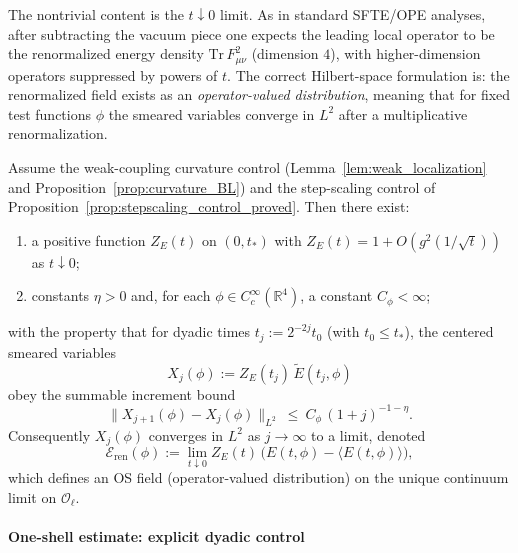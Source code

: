 The nontrivial content is the $t\downarrow 0$ limit.
As in standard SFTE/OPE analyses, after subtracting the vacuum piece one expects the leading local operator to be the renormalized 
energy density $\mathrm{Tr}\,F_{\mu\nu}^2$ (dimension $4$), with higher-dimension operators suppressed by powers of $t$.
The correct Hilbert-space formulation is: the renormalized field exists as an \emph{operator-valued distribution}, meaning that for 
fixed test functions $\phi$ the smeared variables converge in $L^2$ after a multiplicative renormalization.

\begin{proposition}\label{prop:flow_pointfield_cauchy}
Assume the weak-coupling curvature control (Lemma~\ref{lem:weak_localization} and Proposition~\ref{prop:curvature_BL}) and the
step-scaling control of Proposition~\ref{prop:stepscaling_control_proved}.
Then there exist:
\begin{enumerate}[leftmargin=*]
\item a positive function $Z_E(t)$ on $(0,t_*)$ with $Z_E(t)=1+O(g^2(1/\sqrt t))$ as $t\downarrow 0$;
\item constants $\eta>0$ and, for each $\phi\in C_c^{\infty}(\mathbb R^4)$, a constant $C_\phi<\infty$;
\end{enumerate}
with the property that for dyadic times $t_j:=2^{-2j}t_0$ (with $t_0\le t_*$), the centered smeared variables
\begin{equation}\label{eq:ren_series_terms}
 X_j(\phi):= Z_E(t_j)\,\widetilde E(t_j,\phi)
\end{equation}
obey the summable increment bound
\begin{equation}\label{eq:dyadic_increment_bound}
 \|X_{j+1}(\phi)-X_j(\phi)\|_{L^2}\ \le\ C_\phi\,(1+j)^{-1-\eta}.
\end{equation}
Consequently $X_j(\phi)$ converges in $L^2$ as $j\to\infty$ to a limit, denoted
\begin{equation}\label{eq:F2ren_by_flow}
 \mathcal E_{\mathrm{ren}}(\phi)
 :=\lim_{t\downarrow 0} Z_E(t)\,\bigl(E(t,\phi)-\langle E(t,\phi)\rangle\bigr),
\end{equation}
which defines an OS field (operator-valued distribution) on the unique continuum limit on $\mathcal O_{\ell}$.
\end{proposition}

\paragraph*{One-shell estimate: explicit dyadic control}

